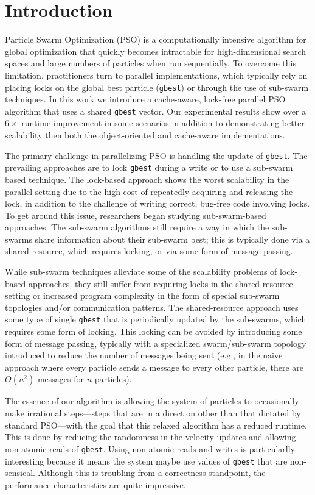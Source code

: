 \section{Introduction}
Particle Swarm Optimization (PSO) is a computationally intensive algorithm for
global optimization that quickly becomes intractable for
high-dimensional search spaces and large numbers of particles when run
sequentially. To overcome this limitation, practitioners turn to parallel
implementations, which typically rely on placing locks on the global best
particle (\texttt{gbest}) or through the use of sub-swarm techniques. In this
work we introduce a cache-aware, lock-free parallel PSO algorithm that uses a
shared \texttt{gbest} vector. Our experimental results show over a $6\times$
runtime improvement in some scenarios in addition to demonstrating better
scalability then both the object-oriented and cache-aware implementations.

The primary challenge in parallelizing PSO is handling the update of
\texttt{gbest}. The prevailing approaches are to lock \texttt{gbest} during a
write or to use a sub-swarm based technique. The lock-based approach shows the
worst scalability in the parallel setting due to the high cost of repeatedly
acquiring and releasing the lock, in addition to the challenge of writing
correct, bug-free code involving locks. To get around this issue, researchers began
studying sub-swarm-based approaches. The sub-swarm algorithms still require a
way in which the sub-swarms share information about their sub-swarm best; this
is typically done via a shared resource, which requires locking, or via some
form of message passing.

While sub-swarm techniques alleviate some of the scalability problems of
lock-based approaches, they still suffer from requiring locks in the
shared-resource setting
or increased program complexity in the form of special sub-swarm topologies
and/or communication patterns. The shared-resource approach uses some type of
single \texttt{gbest} that is periodically updated by the sub-swarms, which
requires some form of locking. This locking can be avoided by introducing some
form of message passing, typically with a specialized swarm/sub-swarm topology
introduced to reduce the number of messages being sent (e.g., in the naive
approach where every particle sends a message to every other particle, there are
$O(n^2)$ messages for $n$ particles).

The essence of our algorithm is allowing the system of particles to occasionally
make irrational steps---steps that are in a direction other than that dictated by
standard PSO---with the goal that this relaxed algorithm has a reduced runtime.
This is done by reducing the randomness in the velocity updates and
allowing non-atomic reads of \texttt{gbest}. Using non-atomic reads and writes
is particularlly interesting because it means the system maybe use values of
\texttt{gbest} that are non-sensical. Although this is troubling from a
correctness standpoint, the performance characteristics are quite impressive.

